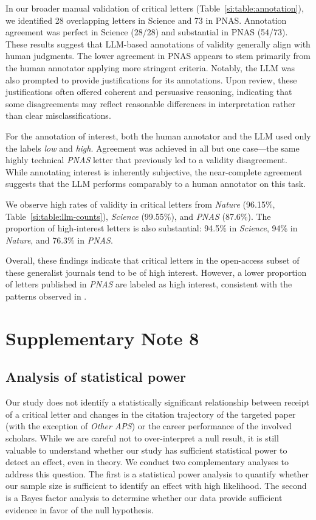 \documentclass[12pt]{article} %
\begin{document}
In our broader manual validation of critical letters (Table~\ref{si:table:annotation}), we identified 28 overlapping letters in Science and 73 in PNAS. Annotation agreement was perfect in Science (28/28) and substantial in PNAS (54/73). These results suggest that LLM-based annotations of validity generally align with human judgments. The lower agreement in PNAS appears to stem primarily from the human annotator applying more stringent criteria.
Notably, the LLM was also prompted to provide justifications for its annotations. Upon review, these justifications often offered coherent and persuasive reasoning, indicating that some disagreements may reflect reasonable differences in interpretation rather than clear misclassifications.

For the annotation of interest, both the human annotator and the LLM used only the labels \textit{low} and \textit{high}. 
Agreement was achieved in all but one case—the same highly technical \textit{PNAS} letter that previously led to a validity disagreement. 
While annotating interest is inherently subjective, the near-complete agreement suggests that the LLM performs comparably to a human annotator on this task.

We observe high rates of validity in critical letters from \textit{Nature} (96.15\%, Table~\ref{si:table:llm-counts}), \textit{Science} (99.55\%), and \textit{PNAS} (87.6\%). The proportion of high-interest letters is also substantial: 94.5\% in \textit{Science}, 94\% in \textit{Nature}, and 76.3\% in \textit{PNAS}.

Overall, these findings indicate that critical letters in the open-access subset of these generalist journals tend to be of high interest. However, a lower proportion of letters published in \textit{PNAS} are labeled as high interest, consistent with the patterns observed in .

\section*{Supplementary Note 8}
\label{si:text:power-analysis}
\subsection*{Analysis of statistical power}
Our study does not identify a statistically significant relationship between receipt of a critical letter and changes in the citation trajectory of the targeted paper (with the exception of \textit{Other APS}) or the career performance of the involved scholars. 
While we are careful not to over-interpret a null result, it is still valuable to understand whether our study has sufficient statistical power to detect an effect, even in theory. 
We conduct two complementary analyses to address this question.
The first is a statistical power analysis to quantify whether our sample size is sufficient to identify an effect with high likelihood. The second is a Bayes factor analysis to determine whether our data provide sufficient evidence in favor of the null hypothesis.
\end{document}
